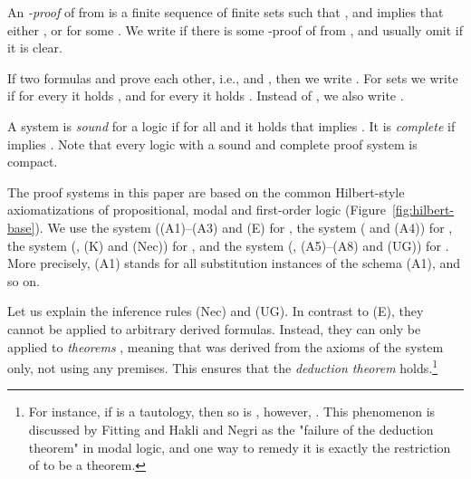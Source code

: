\documentclass[a4paper,english,fleqn,11pt,final]{scrartcl}
\makeatletter
\newcommand{\ie}{i.e.\@\xspace}
\newcommand{\Deriv}[1]{{\normalfont\textsf{#1}}}
\theoremstyle{plain}
\theoremstyle{definition}
\makeatother
\begin{document}
An \emph{-proof } of  from  is a finite sequence  of finite sets  such that , and  implies that either , or  for some .
We write  if there is some -proof of  from , and usually omit  if it is clear.

If two formulas  and  prove each other, \ie,  and , then we write .
For sets we write  if for every  it holds , and for every  it holds .
Instead of , we also write .

A system  is \emph{sound} for a logic  if for all  and  it holds that  implies .
It is \emph{complete} if  implies .
Note that every logic  with a sound and complete proof system is compact.

\medskip

The proof systems in this paper are based on the common Hilbert-style axiomatizations of propositional, modal and first-order logic (Figure~\ref{fig:hilbert-base}).
We use the system  (\Deriv{(A1)}--\Deriv{(A3)} and \Deriv{(E)} for , the system  ( and \Deriv{(A4)}) for , the system  (, \Deriv{(K)} and \Deriv{(Nec)}) for , and the system  (, \Deriv{(A5)}--\Deriv{(A8}) and \Deriv{(UG)}) for .
More precisely, \Deriv{(A1)} stands for all substitution instances of the schema \Deriv{(A1)}, and so on.

Let us explain the inference rules \Deriv{(Nec)} and \Deriv{(UG)}.
In contrast to \Deriv{(E)}, they cannot be applied to arbitrary derived formulas.
Instead, they can only be applied to \emph{theorems} , meaning that  was derived from the axioms of the system only, not using any premises.
This ensures that the \emph{deduction theorem} holds.\footnote{For instance, if  is a tautology, then so is , however, .
This phenomenon is discussed by Fitting and Hakli and Negri \cite{deduction_fail,patrick_blackburn_2_2007} as the "failure of the deduction theorem" in modal logic, and one way to remedy it is exactly the restriction of  to be a theorem.}
\end{document}
